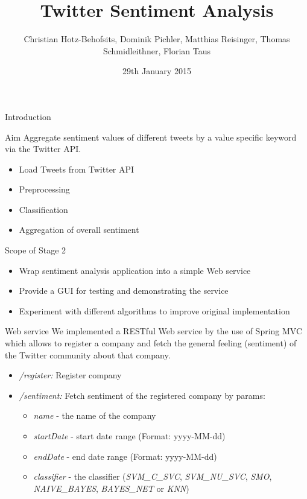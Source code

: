 \documentclass{beamer}
\title[Twitter Sentiment Analysis]{Twitter Sentiment Analysis}
\author{Christian Hotz-Behofsits, Dominik Pichler, Matthias Reisinger, Thomas Schmidleithner, Florian Taus}
\institute{Advanced Internet Computing}
\date{29th January 2015}
\begin{document}
\begin{frame}
  \titlepage
\end{frame}
\begin{frame}{Introduction}
\begin{block}{Aim}
Aggregate sentiment values of different tweets by a value specific keyword via the Twitter API.
\end{block}
\begin{itemize}
   \item Load Tweets from Twitter API
   \item Preprocessing
   \item Classification
   \item Aggregation of overall sentiment
\end{itemize}
\end{frame}

\begin{frame}{Scope of Stage 2}

\begin{itemize}
 \item Wrap sentiment analysis application into a simple Web service
 \item Provide a GUI for testing and demonstrating the service
 \item Experiment with different algorithms to improve original implementation
\end{itemize}

\end{frame}

\begin{frame}{Web service}
We implemented a RESTful Web service by the use of Spring MVC which allows to register a company 
and fetch the general feeling (sentiment) of the Twitter community about that company.
\begin{itemize}
 \item \emph{/register:} Register company 
 \item \emph{/sentiment:} Fetch sentiment of the registered company by params:
  \begin{itemize}
	\item \emph{name} - the name of the company
	\item \emph{startDate} - start date range (Format: yyyy-MM-dd)
	\item \emph{endDate} - end date range (Format: yyyy-MM-dd)
	\item \emph{classifier} - the classifier (\emph{SVM\_C\_SVC}, \emph{SVM\_NU\_SVC}, \emph{SMO}, \emph{NAIVE\_BAYES}, \emph{BAYES\_NET} or \emph{KNN})
 \end{itemize}
\end{itemize}
\end{frame}
\end{document}
